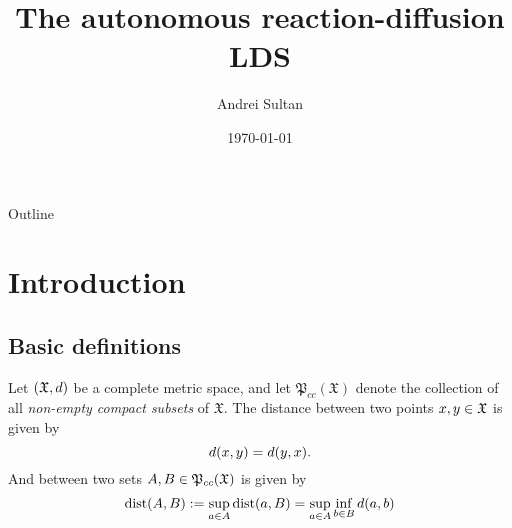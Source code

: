 \documentclass[11pt]{beamer}
\begin{document}
\title[Laplacian LDS]{The autonomous reaction-diffusion LDS}
\author[Andrei Sultan]{Andrei Sultan}
\date{\today} %
\begin{frame}
    \titlepage
\end{frame}

\begin{frame}{Outline}
    \tableofcontents
\end{frame}

\section{Introduction}
\subsection{Basic definitions}

\begin{frame}
    Let $(\mathfrak{X}, \mathnormal{d})$ be a complete metric space, and let $\mathfrak{P}_{cc}(\mathfrak{X})$ denote the collection of all \textit{non-empty compact subsets} of $\mathfrak{X}$. 
    The distance between two points $\mathnormal{x, y} \in \mathfrak{X}$ is given by
    \[
    \mathnormal{d}(\mathnormal{x, y}) = \mathnormal{d}(\mathnormal{y, x}).
    \]
    And between two sets $\mathnormal{A, B} \in \mathfrak{P}_{cc}(\mathfrak{X})$ is given by
    \[
        \text{dist}(\mathnormal{A, B}) := \sup_{\mathnormal{a} \in \mathnormal{A}} \text{dist}(\mathnormal{a, B}) = \sup_{\mathnormal{a} \in \mathnormal{A}} \inf_{\mathnormal{b} \in \mathnormal{B}} \mathnormal{d}(\mathnormal{a, b})
    \]
    
    


\end{frame}
\end{document}
